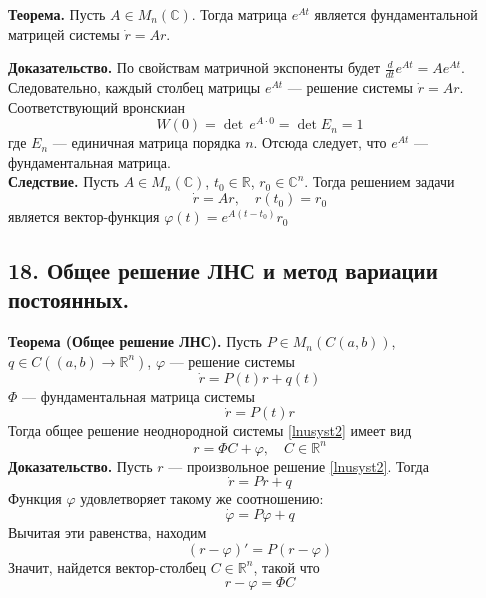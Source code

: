 \noindent \textbf{Теорема.} Пусть $A \in M_n(\mathbb{C})$. Тогда матрица $e^{At}$ является фундаментальной матрицей системы $\dot{r} = Ar$.

\noindent \textbf{Доказательство.} По свойствам матричной экспоненты будет $\frac{d}{dt}e^{At} = Ae^{At}$. Следовательно, каждый столбец матрицы $e^{At}$ --- решение системы $\dot{r} = Ar$. Соответствующий вронскиан
\begin{equation*}
    W(0) = \det\, e^{A\cdot 0} = \det E_n = 1
\end{equation*}
где $E_n$ --- единичная матрица порядка $n$. Отсюда следует, что $e^{At}$ --- фундаментальная матрица.\\

\noindent \textbf{Следствие.} Пусть $A \in M_n(\mathbb{C})$, $t_0 \in \mathbb{R}$, $r_0 \in \mathbb{C}^n$. Тогда решением задачи
\begin{equation*}
    \dot{r} = Ar, \quad r(t_0) = r_0
\end{equation*}
является вектор-функция $\varphi(t) = e^{A(t - t_0)}r_0$

\subsection*{18. Общее решение ЛНС и метод вариации постоянных.}

\textbf{Теорема (Общее решение ЛНС).} Пусть $P \in M_n(C(a,b))$, $q \in C((a,b) \to \mathbb{R}^n)$, $\varphi$ --- решение системы
\begin{equation}
    \dot{r} = P(t)r + q(t) \label{lnusyst2}
\end{equation}
$\Phi$ --- фундаментальная матрица системы
\begin{equation*}
    \dot{r} = P(t)r
\end{equation*}
Тогда общее решение неоднородной системы \eqref{lnusyst2} имеет вид
\begin{equation*}
    r = \Phi C + \varphi, \quad C \in \mathbb{R}^n
\end{equation*}
\textbf{Доказательство.} Пусть $r$ --- произвольное решение \eqref{lnusyst2}. Тогда
\begin{equation*}
    \dot{r} = Pr + q
\end{equation*}
Функция $\varphi$ удовлетворяет такому же соотношению:
\begin{equation*}
    \dot{\varphi} = P\varphi + q
\end{equation*}
Вычитая эти равенства, находим
\begin{equation*}
    (r - \varphi)' = P(r - \varphi)
\end{equation*}
Значит, найдется вектор-столбец $C \in \mathbb{R}^n$, такой что
\begin{equation*}
    r - \varphi = \Phi C
\end{equation*}

